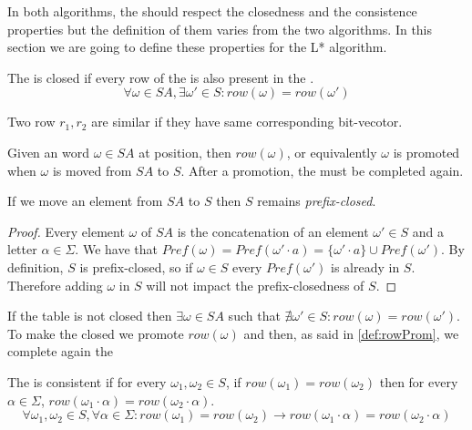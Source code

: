 In both algorithms, the \OT should respect the closedness and the consistence properties but the definition of them varies from the two algorithms. In this section we are going to define these properties for the L* algorithm.

\begin{definition}[Closedness]
  The \OT is closed if every row of the \lowerPart is also present in the \upperPart.
  \[\forall \omega \in SA, \exists \omega' \in S : row(\omega) = row(\omega')\]
\end{definition}

\begin{definition} Two row $r_1, r_2$ are similar if they have same corresponding bit-vecotor.
\end{definition}

\begin{definition}
  \label{def:rowProm}
  Given an word $\omega \in SA$ at position, then $row(\omega)$, or equivalently $\omega$ is promoted when $\omega$ is moved from $SA$ to $S$. After a promotion, the \OT must be completed again.
\end{definition}

\begin{lemma}
  \label{lemmaPromoteLinePrefixClosedness}
  If we move an element from $SA$ to $S$ then $S$ remains \textit{prefix-closed}.
\end{lemma}

\begin{proof}
  Every element $\omega$ of $SA$ is the concatenation of an element $\omega' \in S$ and a letter $\alpha \in \Sigma$. We have that $Pref(\omega) = Pref(\omega' \cdot a) = \{\omega' \cdot a\} \cup Pref(\omega')$. By definition, $S$ is prefix-closed, so if $\omega \in S$ every $Pref(\omega')$ is already in $S$. Therefore adding $\omega$ in $S$ will not impact the prefix-closedness of $S$.
\end{proof}

If the table is not closed then $\exists \omega \in SA$ such that $\nexists \omega' \in S : row(\omega) = row(\omega')$. To make the \OT closed we promote $row(\omega)$ and then, as said in \cref{def:rowProm}, we complete again the \OT

\begin{definition}[Consistence]
  The \OT is consistent if for every $\omega_1,\omega_2 \in S$, if $row(\omega_1) = row(\omega_2)$ then for every $\alpha \in \Sigma$, $row(\omega_1 \cdot \alpha) = row(\omega_2 \cdot \alpha)$.
  \[\forall \omega_1,\omega_2 \in S, \forall \alpha \in \Sigma :  row(\omega_1) = row(\omega_2) \rightarrow row(\omega_1 \cdot \alpha) = row(\omega_2 \cdot \alpha)\]
\end{definition}

